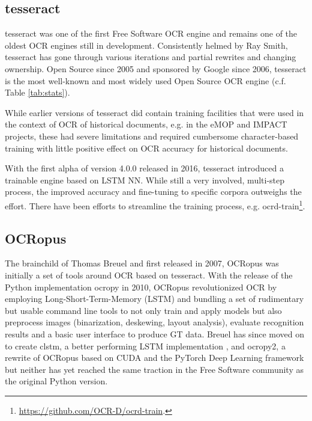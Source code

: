 \documentclass[conference]{IEEEtran}
\begin{document}
\subsection*{tesseract}

tesseract \cite{4376991} was one of the first Free Software OCR
engine and remains one of the oldest OCR engines still in
development. Consistently helmed by Ray Smith, tesseract has gone
through various iterations and partial rewrites and changing
ownership. Open Source since 2005 and sponsored by Google since
2006, tesseract is the most well-known and most widely used Open
Source OCR engine (c.f. Table \ref{tab:stats}).

While earlier versions of tesseract did contain training facilities
that were used in the context of OCR of historical documents, e.g.
in the eMOP \cite{doi:10.1093/llc/fqv062} and IMPACT \cite{PSNC}
projects, these had severe limitations and required cumbersome
character-based training with little positive effect on OCR
accuracy for historical documents.


With the first alpha of version 4.0.0 released in 2016, tesseract introduced a trainable
engine based on LSTM NN. While still a very involved, multi-step process, the
improved accuracy and fine-tuning to specific corpora outweighs the effort.
There have been efforts to streamline the training process, e.g.
ocrd-train\footnote{\url{https://github.com/OCR-D/ocrd-train}.}.


\subsection*{OCRopus}

The brainchild of Thomas Breuel and first released in 2007, OCRopus
\cite{breuel} was initially a set of tools around OCR based on
tesseract. With the release of the Python implementation ocropy in
2010, OCRopus revolutionized OCR by employing
Long-Short-Term-Memory (LSTM) and bundling a set of rudimentary but
usable command line tools to not only train and apply models but
also preprocess images (binarization, deskewing, layout analysis),
evaluate recognition results and a basic user interface to produce
GT data. Breuel has since moved on to create clstm, a better
performing LSTM implementation \cite{DBLP:conf/icdar/Breuel17}, and
ocropy2, a rewrite of OCRopus based on CUDA and the PyTorch Deep
Learning framework \cite{DBLP:conf/icdar/Breuel17} but neither has
yet reached the same traction in the Free Software community as the
original Python version.
\end{document}
